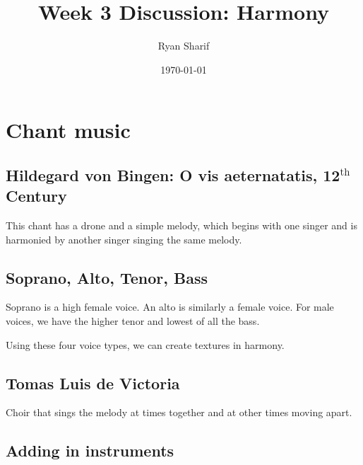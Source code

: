 \documentclass[letter,twoside,twocolumn]{article}
\author{Ryan Sharif}
\date{\today}
\title{Week 3 Discussion: Harmony}
\begin{document}
\maketitle

\section{Chant music}
\label{sec-1}
\subsection{Hildegard von Bingen: O vis aeternatatis, 12$^{\text{th}}$ Century}
\label{sec-1-1}

This chant has a drone and a simple melody, which begins with one singer
and is harmonied by another singer singing the same melody.

\subsection{Soprano, Alto, Tenor, Bass}
\label{sec-1-2}
Soprano is a high female voice. An alto is similarly a female voice.
For male voices, we have the higher tenor and lowest of all the bass.

Using these four voice types, we can create textures in harmony.

\subsection{Tomas Luis de Victoria}
\label{sec-1-3}
Choir that sings the melody at times together and at other times moving apart.

\subsection{Adding in instruments}
\label{sec-1-4}
\end{document}
